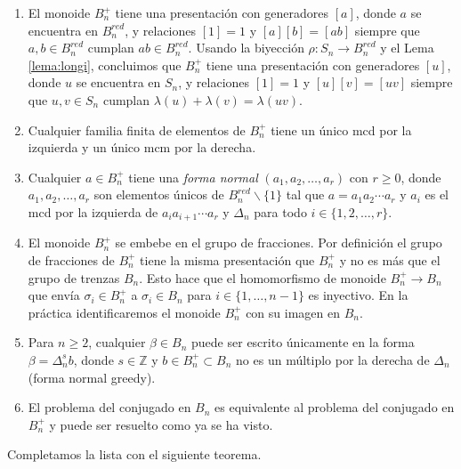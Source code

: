 \documentclass[12pt]{book}
\theoremstyle{definition}
\begin{document}
\begin{enumerate}[label=(\arabic*)]
\item El monoide $B_n^+$ tiene una presentación con generadores $[a]$, donde $a$ se encuentra en $B_n^{red}$, y relaciones $[1]=1$ y $[a][b]=[ab]$ siempre que $a,b\in B_n^{red}$ cumplan $ab\in B_n^{red}$. Usando la biyección $\rho: S_n\rightarrow B_n^{red}$ y el Lema \ref{lema:longi}, concluimos que $B_n^+$ tiene una presentación con generadores $[u]$, donde $u$ se encuentra en $S_n$, y relaciones $[1]=1$ y $[u][v]=[uv]$ siempre que $u,v\in S_n$ cumplan $\lambda(u)+\lambda(v)=\lambda(uv)$.
\item Cualquier familia finita de elementos de $B_n^+$ tiene un único mcd por la izquierda y un único mcm por la derecha.
\item Cualquier $a\in B_n^+$ tiene una \textit{forma normal} $(a_1,a_2,\ldots, a_r)$ con $r\geq 0$, donde $a_1,a_2,\ldots, a_r$ son elementos únicos de $B_n^{red}\backslash\{1\}$ tal que $a=a_1a_2\cdots a_r$ y $a_i$ es el mcd por la izquierda de $a_ia_{i+1}\cdots a_r$ y $\Delta_n$ para todo $i\in\{1,2,\ldots,r\}$.
\item El monoide $B_n^+$ se embebe en el grupo de fracciones. Por definición el grupo de fracciones de $B_n^+$ tiene la misma presentación que $B_n^+$ y no es más que el grupo de trenzas $B_n$. Esto hace que el homomorfismo de monoide $B_n^+\rightarrow B_n$ que envía $\sigma_i\in B_n^+$ a $\sigma_i\in B_n$ para $i\in\{1,\ldots, n-1\}$ es inyectivo. En la práctica identificaremos el monoide $B_n^+$ con su imagen en $B_n$.
\item Para $n\geq 2$, cualquier $\beta\in B_n$ puede ser escrito únicamente en la forma $\beta=\Delta_n^sb$, donde $s\in\mathbb{Z}$ y $b\in B_n^+\subset B_n$ no es un múltiplo por la derecha de $\Delta_n$ (forma normal greedy).
\item El problema del conjugado en $B_n$ es equivalente al problema del conjugado en $B_n^+$ y puede ser resuelto como ya se ha visto.
\end{enumerate}

Completamos la lista con el siguiente teorema.
\end{document}
